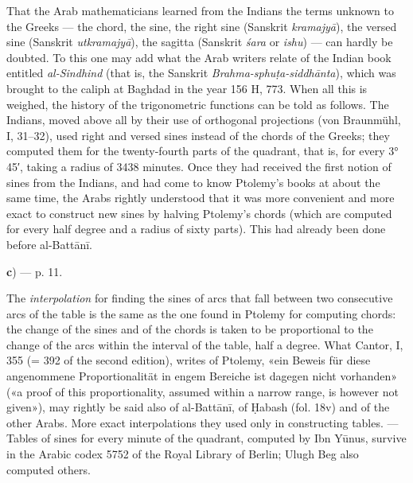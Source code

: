 \documentclass[11pt]{article}
\begin{document}
\par That the Arab mathematicians learned from the Indians the terms unknown to the Greeks — the chord, the sine, the right sine (Sanskrit \emph{kramajyā}), the versed sine (Sanskrit \emph{utkramajyā}), the sagitta (Sanskrit \emph{śara} or \emph{ishu}) — can hardly be doubted. To this one may add what the Arab writers relate of the Indian book entitled \emph{al-Sindhind} (that is, the Sanskrit \emph{Brahma-sphuṭa-siddhānta}), which was brought to the caliph at Baghdad in the year 156 H, 773. When all this is weighed, the history of the trigonometric functions can be told as follows. The Indians, moved above all by their use of orthogonal projections (von Braunmühl, I, 31–32), used right and versed sines instead of the chords of the Greeks; they computed them for the twenty-fourth parts of the quadrant, that is, for every 3° 45′, taking a radius of 3438 minutes. Once they had received the first notion of sines from the Indians, and had come to know Ptolemy's books at about the same time, the Arabs rightly understood that it was more convenient and more exact to construct new sines by halving Ptolemy's chords (which are computed for every half degree and a radius of sixty parts). This had already been done before al-Battānī.\par
\par\begin{center}\textbf{c}) — p. 11.\end{center}
\par The \emph{interpolation} for finding the sines of arcs that fall between two consecutive arcs of the table is the same as the one found in Ptolemy for computing chords: the change of the sines and of the chords is taken to be proportional to the change of the arcs within the interval of the table, half a degree. What Cantor, I, 355 (= 392 of the second edition), writes of Ptolemy, «ein Beweis für diese angenommene Proportionalität in engem Bereiche ist dagegen nicht vorhanden» («a proof of this proportionality, assumed within a narrow range, is however not given»), may rightly be said also of al-Battānī, of Ḥabash (fol. 18v) and of the other Arabs. More exact interpolations they used only in constructing tables. — Tables of sines for every minute of the quadrant, computed by Ibn Yūnus, survive in the Arabic codex 5752 of the Royal Library of Berlin; Ulugh Beg also computed others.\par
\end{document}
